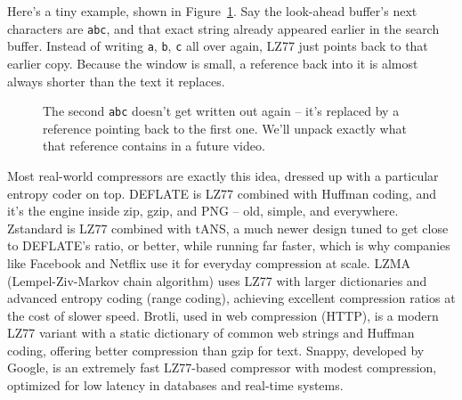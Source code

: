 \documentclass[11pt]{article}
\begin{document}
Here's a tiny example, shown in Figure~\ref{fig:lz77-example}. Say the
look-ahead buffer's next characters are \texttt{abc}, and that exact string
already appeared earlier in the search buffer. Instead of writing
\texttt{a}, \texttt{b}, \texttt{c} all over again, LZ77 just points back to
that earlier copy. Because the window is small, a reference back into it
is almost always shorter than the text it replaces.

\begin{figure}[H]
\centering
{}
\caption*{The second \texttt{abc} doesn't get written out
again -- it's replaced by a reference pointing back to the first one. We'll
unpack exactly what that reference contains in a future video.}
\label{fig:lz77-example}
\end{figure}

Most real-world compressors are exactly this idea, dressed up with a
particular entropy coder on top. DEFLATE is LZ77 combined with Huffman
coding, and it's the engine inside zip, gzip, and PNG -- old, simple, and
everywhere. Zstandard is LZ77 combined with tANS, a much newer design tuned
to get close to DEFLATE's ratio, or better, while running far faster, which
is why companies like Facebook and Netflix use it for everyday compression
at scale. LZMA (Lempel-Ziv-Markov chain algorithm) uses LZ77 with larger
dictionaries and advanced entropy coding (range coding), achieving
excellent compression ratios at the cost of slower speed. Brotli, used in
web compression (HTTP), is a modern LZ77 variant with a static dictionary
of common web strings and Huffman coding, offering better compression than
gzip for text. Snappy, developed by Google, is an extremely fast
LZ77-based compressor with modest compression, optimized for low latency
in databases and real-time systems.
\end{document}
